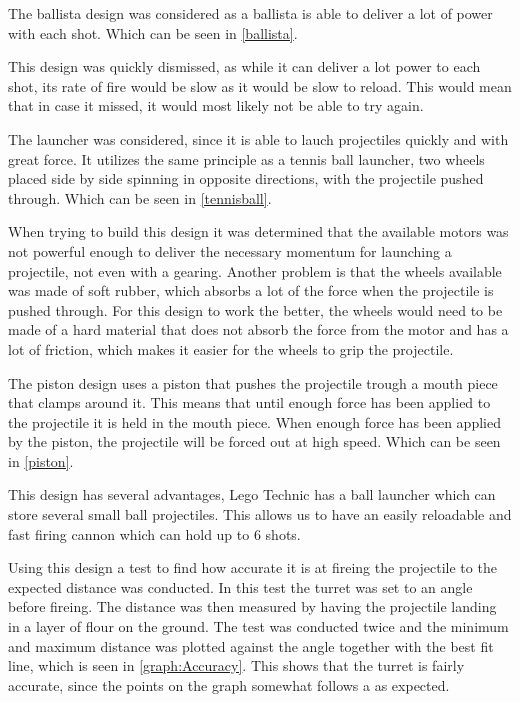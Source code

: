 The ballista design was considered as a ballista is able to deliver a lot of
power with each shot. Which can be seen in \autoref{ballista}.\nl

This design was quickly dismissed, as while it can deliver a lot power to each
shot, its rate of fire would be slow as it would be slow to reload. This would
mean that in case it missed, it would most likely not be able to try again.\nl

The launcher was considered, since it is able to lauch projectiles quickly and
with great force. It utilizes the same principle as a tennis ball launcher, two
wheels placed side by side spinning in opposite directions, with the projectile
pushed through. Which can be seen in \autoref{tennisball}.\nl

When trying to build this design it was determined that the available motors was
not powerful enough to deliver the necessary momentum for launching a
projectile, not even with a gearing. Another problem is that the wheels
available was made of soft rubber, which absorbs a lot of the force when the
projectile is pushed through. For this design to work the better, the wheels
would need to be made of a hard material that does not absorb the force from the
motor and has a lot of friction, which makes it easier for the wheels to
grip the projectile.\nl

The piston design uses a piston that pushes the projectile trough a mouth piece
that clamps around it. This means that until enough force has been applied to
the projectile it is held in the mouth piece. When enough force has been
applied by the piston, the projectile will be forced out at high speed. Which
can be seen in \autoref{piston}.\nl

This design has several advantages, Lego Technic has a ball launcher which can
store several small ball projectiles. This allows us to have an easily
reloadable and fast firing cannon which can hold up to 6 shots.\nl

Using this design a test to find how accurate it is at fireing the projectile
to the expected distance was conducted.
In this test the turret was set to an angle before fireing. The distance was
then measured by having the projectile landing in a layer of flour on the
ground. The test was conducted twice and the minimum and maximum distance was
plotted against the angle together with the best fit line, which is seen in
\autoref{graph:Accuracy}.
This shows that the turret is fairly accurate, since the points on
the graph somewhat follows a  as
expected.


